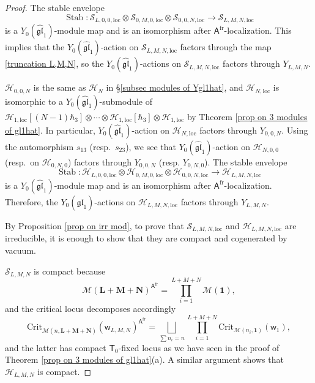 \documentclass[10pt]{amsart}
\theoremstyle{definition}
\numberwithin{equation}{section}
\newcommand{\Crit}{\mathrm{Crit}}
\newcommand{\cH}{\mathcal{H}}
\newcommand{\cM}{\mathcal{M}}
\newcommand{\cS}{\mathcal{S}}
\newcommand{\loc}{\mathrm{loc}}
\newcommand{\sA}{\mathsf{A}}
\newcommand{\sT}{\mathsf{T}}
\newcommand{\sw}{\mathsf{w}}
\newcommand{\Stab}{\operatorname{Stab}}
\begin{document}
\begin{proof}
The stable envelope 
$$\Stab\colon \cS_{L,0,0,\loc}\otimes \cS_{0,M,0,\loc}\otimes \cS_{0,0,N,\loc}\to \cS_{L,M,N,\loc}$$ 
is a $Y_0(\widehat{\mathfrak{gl}}_1)$-module map and is an isomorphism after $\sA^{\mathrm{fr}}$-localization. This implies that the $Y_0(\widehat{\mathfrak{gl}}_1)$-action on $\cS_{L,M,N,\loc}$ factors through the map \eqref{truncation L,M,N}, so the $Y_0(\widehat{\mathfrak{gl}}_1)$-actions on $\cS_{L,M,N,\loc}$ factors through $Y_{L,M,N}$. 

$\cH_{0,0,N}$ is the same as $\cH_N$ in \S \ref{subsec modules of Ygl1hat}, and $\cH_{N,\loc}$ is isomorphic to a $Y_0(\widehat{\mathfrak{gl}}_1)$-submodule of $\cH_{1,\loc}[(N-1)\hbar_3]\otimes\cdots\otimes \cH_{1,\loc}[\hbar_3]\otimes \cH_{1,\loc}$ by Theorem \ref{prop on 3 modules of gl1hat}. In particular, $Y_0(\widehat{\mathfrak{gl}}_1)$-action on $\cH_{N,\loc}$ factors through $Y_{0,0,N}$. Using the automorphism $s_{13}$ 
(resp.~$s_{23}$), we see that $Y_0(\widehat{\mathfrak{gl}}_1)$-action on $\cH_{N,0,0}$ (resp.~on $\cH_{0,N,0}$) factors through $Y_{0,0,N}$ (resp. $Y_{0,N,0}$). The stable envelope 
$$\Stab\colon \cH_{L,0,0,\loc}\otimes \cH_{0,M,0,\loc}\otimes \cH_{0,0,N,\loc}\to \cH_{L,M,N,\loc}$$ is a $Y_0(\widehat{\mathfrak{gl}}_1)$-module map and is an isomorphism after $\sA^{\mathrm{fr}}$-localization. Therefore, the $Y_0(\widehat{\mathfrak{gl}}_1)$-actions on $\cH_{L,M,N,\loc}$ factors through $Y_{L,M,N}$.

By Proposition \ref{prop on irr mod}, to prove that $\cS_{L,M,N,\loc}$ and $\cH_{L,M,N,\loc}$ are irreducible, it is enough to show that they are compact and cogenerated by vacuum.

$\cS_{L,M,N}$ is compact because 
$$\cM(\mathbf L+\mathbf M+\mathbf N)^{\sA^{\mathrm{fr}}}=\prod_{i=1}^{L+M+N}\cM(\mathbf 1),$$ 
and the critical locus decomposes accordingly 
$$\Crit_{\cM(n,\mathbf L+\mathbf M+\mathbf N)}(\sw_{L,M,N})^{\sA^{\mathrm{fr}}}=\bigsqcup_{\sum n_i=n}\prod_{i=1}^{L+M+N}\Crit_{\cM(n_i,\mathbf 1)}(\sw_1), $$ 
and the latter has compact $\sT_0$-fixed locus as we have seen in the proof of Theorem \ref{prop on 3 modules of gl1hat}(a). A similar argument shows that $\cH_{L,M,N}$ is compact.


\end{proof}
\end{document}
